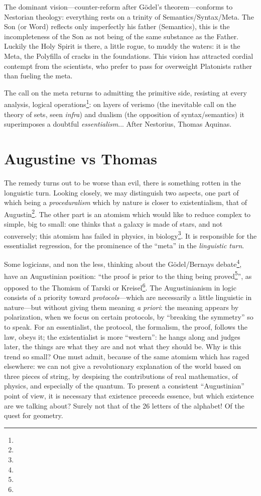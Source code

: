 \documentclass{article}
\begin{document}
The dominant vision---counter-reform after Gödel's theorem---conforms to Nestorian theology: everything rests on a trinity of Semantics/Syntax/Meta. The Son (or Word) reflects only imperfectly his father (Semantics), this is the incompleteness of the Son as not being of the same substance as the Father. Luckily the Holy Spirit is there, a little rogue, to muddy the waters: it is the Meta, the Polyfilla of cracks in the foundations. This vision has attracted cordial contempt from the scientists, who prefer to pass for overweight Platonists rather than fueling the meta.

The call on the meta returns to admitting the primitive side, resisting at every analysis, logical operations\footnote{}: on layers of verismo (the inevitable call on the theory of sets, seen \emph{infra}) and dualism (the opposition of syntax/semantics) it superimposes a doubtful \emph{essentialism}... After Nestorius, Thomas Aquinas.

\section{Augustine vs Thomas}
The remedy turns out to be worse than evil, there is something rotten in the longuistic turn. Looking closely, we may distinguish two aspects, one part of which being a \emph{proceduralism} which by nature is closer to existentialism, that of Augustin\footnote{}. The other part is an atomism which would like to reduce complex to simple, big to small: one thinks that a galaxy is made of stars, and not conversely; this atomism has failed in physics, in biology\footnote{}. It is responsible for the essentialist regression, for the prominence of the \enquote{meta} in the \emph{linguistic turn}.

Some logicians, and non the less, thinking about the Gödel/Bernays debate\footnote{}, have an Augustinian position: \enquote{the proof is prior to the thing being proved\footnote{}}, as opposed to the Thomism of Tarski or Kreisel\footnote{}. The Augustinianism in logic consists of a priority toward \emph{protocols}---which are necessarily a little linguistic in nature---but without giving them meaning \emph{a priori}: the meaning appears by polarization, when we focus on certain protocols, by \enquote{breaking the symmetry} so to speak. For an essentialist, the protocol, the formalism, the proof, follows the law, obeys it; the existentialist is more \enquote{western}: he hangs along and judges later, the things are what they are and not what they should be. Why is this trend so small? One must admit, because of the same atomism which has raged elsewhere: we can not give a revolutionary explanation of the world based on three pieces of string, by despising the contributions of real mathematics, of physics, and especially of the quantum. To present a consistent \enquote{Augustinian} point of view, it is necessary that existence preceeds essence, but which existence are we talking about? Surely not that of the 26 letters of the alphabet! Of the quest for geometry.
\end{document}
